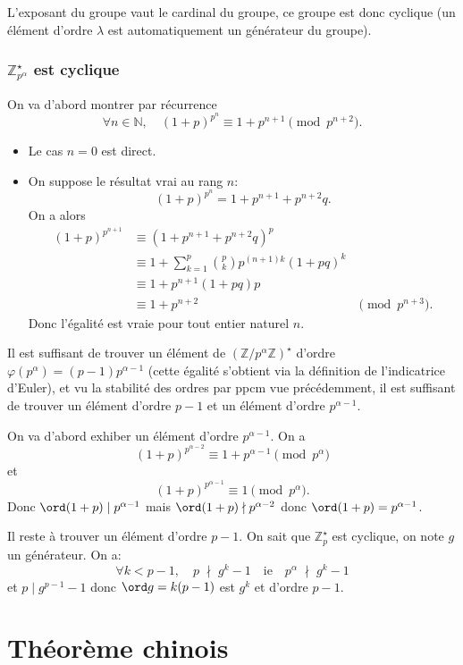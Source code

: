 L'exposant du groupe vaut le cardinal du groupe, ce groupe est donc cyclique (un élément d'ordre $\lambda$ est automatiquement un générateur du groupe).

\subsubsection{$\mathbb Z_{p^\alpha}^\star$ est cyclique}

On va d'abord montrer par récurrence \[
    \forall n\in\mathbb N, \quad (1+p)^{p^n}\equiv 1+p^{n+1}\pmod {p^{n+2}}.
\]

\begin{itemize}
    \item Le cas $n=0$ est direct.
    \item On suppose le résultat vrai au rang $n$: \[
        (1+p)^{p^n}=1+p^{n+1}+p^{n+2}q.
    \]
    On a alors \begin{align*}
        (1+p)^{p^{n+1}}&\equiv(1+p^{n+1}+p^{n+2}q)^p\\
                       &\equiv 1+\sum_{k=1}^{p}\binom pk p^{(n+1)k}(1+pq)^k\\ 
                       &\equiv 1 + p^{n+1}(1+pq)p \\
                       &\equiv 1+p^{n+2}&\pmod{p^{n+3}}.
    \end{align*}
    Donc l'égalité est vraie pour tout entier naturel $n$.
\end{itemize}
Il est suffisant de trouver un élément de $(\mathbb Z/p^\alpha\mathbb Z)^\star$ d'ordre $\varphi(p^\alpha)=(p-1)p^{\alpha-1}$ (cette égalité s'obtient via la définition de l'indicatrice d'Euler), et vu la stabilité des ordres par ppcm vue précédemment, il est suffisant de trouver un élément d'ordre $p-1$ et un élément d'ordre $p^{\alpha-1}$.

On va d'abord exhiber un élément d'ordre $p^{\alpha-1}$. On a 
\[
(1+p)^{p^{\alpha-2}} 
\equiv 1+p^{\alpha-1}\pmod {p^\alpha}    \]
et \[
    (1+p)^{p^{\alpha-1}}\equiv 1\pmod {p^\alpha}.
\]
Donc $\ord(1+p)\mid p^{\alpha-1}$ mais $\ord(1+p)\nmid p^{\alpha-2}$ donc $\ord(1+p)=p^{\alpha-1}$.

Il reste à trouver un élément d'ordre $p-1$. On sait que $\mathbb Z_p^\star$ est cyclique, on note $g$ un générateur. On a:
\[
    \forall k<p-1, \quad p\;\nmid\;g^k-1\quad \text{ie}\quad p^\alpha\;\nmid\; g^k-1
\]
et $p\mid g^{p-1}-1$ donc $\ord g=k(p-1)$ est $g^k$ et d'ordre $p-1$.

\section{Théorème chinois}

